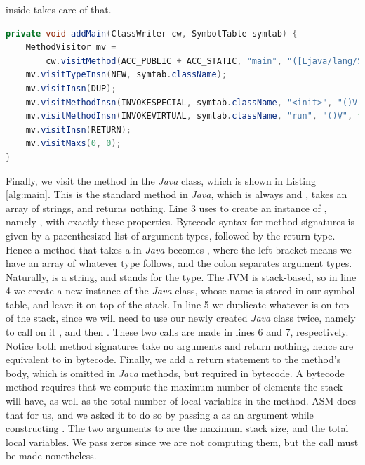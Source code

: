 inside  takes care of that.

\begin{lstlisting}[basicstyle=\scriptsize,language=Java,caption={Using the ASM framework to construct a \il{main} method.},label={alg:main}]
private void addMain(ClassWriter cw, SymbolTable symtab) {
	MethodVisitor mv =
		cw.visitMethod(ACC_PUBLIC + ACC_STATIC, "main", "([Ljava/lang/String;)V", null, null);
	mv.visitTypeInsn(NEW, symtab.className);
	mv.visitInsn(DUP);
	mv.visitMethodInsn(INVOKESPECIAL, symtab.className, "<init>", "()V", false);
	mv.visitMethodInsn(INVOKEVIRTUAL, symtab.className, "run", "()V", false);
	mv.visitInsn(RETURN);
	mv.visitMaxs(0, 0);
}
\end{lstlisting}

Finally, we visit the  method in the \emph{Java} class, which is shown in Listing \ref{alg:main}. This is the standard  method in \emph{Java}, which is always  and , takes an array of strings, and returns nothing. Line 3 uses  to create an instance of , namely , with exactly these properties. Bytecode syntax for method signatures is given by a parenthesized list of argument types, followed by the return type. Hence a  method that takes a  in \emph{Java} becomes \il{([Ljava/lang/String;)V}, where the left bracket means we have an array of whatever type follows, and the colon separates argument types. Naturally,  is a string, and  stands for the  type. The JVM is stack-based, so in line 4 we create a new instance of the \emph{Java} class, whose name is stored in our symbol table, and leave it on top of the stack. In line 5 we duplicate whatever is on top of the stack, since we will need to use our newly created \emph{Java} class twice, namely to call on it , and then . These two calls are made in lines 6 and 7, respectively. Notice both method signatures take no arguments and return nothing, hence are equivalent to  in bytecode. Finally, we add a return statement to the  method's body, which is omitted in  \emph{Java} methods, but required in bytecode. A bytecode method requires that we compute the maximum number of elements the stack will have, as well as the total number of local variables in the method. ASM does that for us, and we asked it to do so by passing a  as an argument while constructing . The two arguments to  are the maximum stack size, and the total local variables. We pass zeros since we are not computing them, but the call must be made nonetheless.

